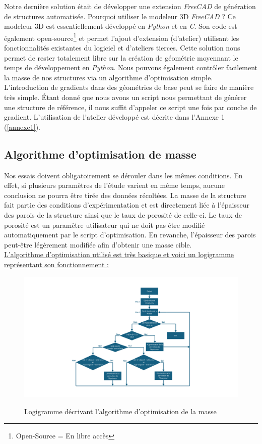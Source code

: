 \documentclass[a4paper]{article}
\begin{document}
	Notre dernière solution était de développer une extension \textit{FreeCAD} de génération de structures automatisée. Pourquoi utiliser le modeleur 3D \textit{FreeCAD} ? Ce modeleur 3D est essentiellement développé en \textit{Python} et en \textit{C}. Son code est également open-source\footnote{Open-Source = En libre accès} et permet l’ajout d’extension (d’atelier) utilisant les fonctionnalités existantes du logiciel et d’ateliers tierces. Cette solution nous permet de rester totalement libre sur la création de géométrie moyennant le temps de développement en \textit{Python}. Nous pouvons également contrôler facilement la masse de nos structures via un algorithme d’optimisation simple. L’introduction de gradients dans des géométries de base peut se faire de manière très simple. Étant donné que nous avons un script nous permettant de générer une structure de référence, il nous suffit d’appeler ce script une fois par couche de gradient. L'utilisation de l'atelier développé est décrite dans l'Annexe 1 (\ref{annexe1}).
	\newpage
	
	\subsection{Algorithme d'optimisation de masse}
	\hspace{0.5cm}Nos essais doivent obligatoirement se dérouler dans les mêmes conditions. En effet, si plusieurs paramètres de l’étude varient en même temps, aucune conclusion ne pourra être tirée des données récoltées. La masse de la structure fait partie des conditions d’expérimentation et est directement liée à l’épaisseur des parois de la structure ainsi que le taux de porosité de celle-ci. Le taux de porosité est un paramètre utilisateur qui ne doit pas être modifié automatiquement par le script d’optimisation. En revanche, l’épaisseur des parois peut-être légèrement modifiée afin d’obtenir une masse cible.\label{masse}\\
	
	\underline{L’algorithme d’optimisation utilisé est très basique et voici un logigramme représentant son fonctionnement :}\\
	
	\begin{figure}[H]
		\centering
		\includegraphics[width=16.5cm]{Images/4/log_opti_masse.pdf}\\
		\caption{Logigramme décrivant l'algorithme d'optimisation de la masse}
	\end{figure}
	\newpage
\end{document}
